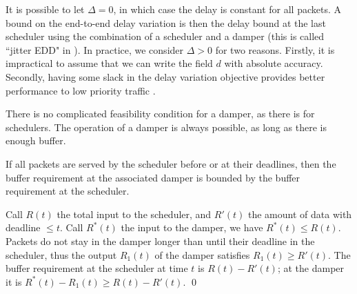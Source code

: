 It is possible to let $\Delta=0$, in which case the delay is
constant for all packets. A bound on the end-to-end delay
variation is then the delay bound at the last scheduler using the
combination of a scheduler and a damper (this is called ``jitter
EDD" in \cite{jitterEDD91}). In practice, we consider $\Delta >0$
for two reasons. Firstly, it is impractical to assume that we can
write the field $d$ with absolute accuracy. Secondly, having some
slack in the delay variation objective provides better performance
to low priority traffic \cite{CruzSCED}.

There is no complicated feasibility condition for a damper, as
there is for schedulers. The operation of a damper is always
possible, as long as there is enough buffer.

\begin{proposition}
If all packets are served by the scheduler before or at their
deadlines, then the buffer requirement at the associated damper is
bounded by the buffer requirement at the scheduler.
\end{proposition}
\pr
Call $R(t)$ the total input to the scheduler, and $R'(t)$ the
amount of data with deadline $\leq t$. Call $R^*(t)$ the input to
the damper, we have $R^*(t) \leq R(t)$. Packets do not stay in the
damper longer than until their deadline in the scheduler, thus the
output $R_1(t)$ of the damper satisfies $R_1(t) \geq R'(t)$. The
buffer requirement at the scheduler at time $t$ is $R(t)- R'(t)$;
at the damper it is $R^*(t)-R_1(t)\geq R(t)- R'(t)$. \qed


